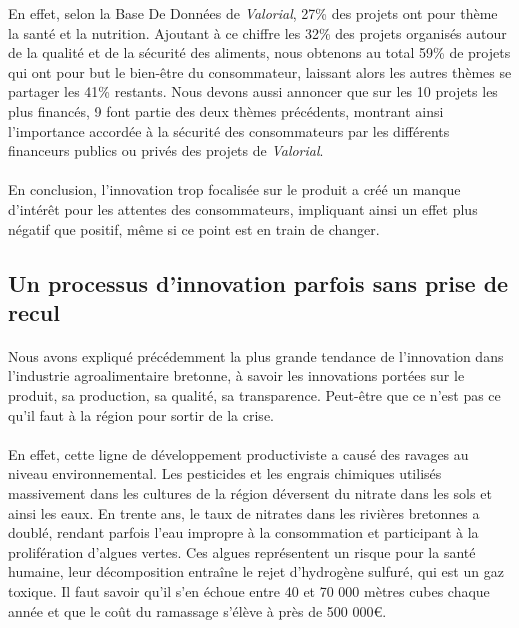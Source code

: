 \documentclass[a4paper,12pt]{report}
\begin{document}
			En effet, selon la Base De Données de \textit{Valorial}, 27\% des projets ont pour thème la santé et la nutrition. Ajoutant à ce chiffre les 32\% des projets  organisés autour de la qualité et de la sécurité des aliments, nous obtenons au total 59\% de projets qui ont pour but le bien-être du consommateur, laissant alors les autres thèmes se partager les 41\% restants. Nous devons aussi annoncer que sur les 10 projets les plus financés, 9 font partie des deux thèmes précédents, montrant ainsi l’importance accordée à la sécurité des consommateurs par les différents financeurs publics ou privés des projets de \textit{Valorial}.
			
			\paragraph{}En conclusion, l'innovation trop focalisée sur le produit a créé un manque d'intérêt pour les attentes des consommateurs, impliquant ainsi un effet plus négatif que positif, même si ce point est en train de changer.
						
		\subsection{Un processus d'innovation parfois sans prise de recul}
			
			\paragraph{}Nous avons expliqué précédemment la plus grande tendance de l’innovation dans l’industrie agroalimentaire bretonne, à savoir les innovations portées sur le produit, sa production, sa qualité, sa transparence. Peut-être que ce n’est pas ce qu’il faut à la région pour sortir de la crise.
			
			\paragraph{}En effet, cette ligne de développement productiviste a causé des ravages au niveau environnemental. Les pesticides et les engrais chimiques utilisés massivement dans les cultures de la région déversent du nitrate dans les sols et ainsi les eaux. En trente ans, le taux de nitrates dans les rivières bretonnes a doublé, rendant parfois l’eau impropre à la consommation et participant à la prolifération d’algues vertes\cite{NitratesAlguesVertesBretagne}. Ces algues représentent un risque pour la santé humaine, leur décomposition entraîne le rejet d’hydrogène sulfuré, qui est un gaz toxique. Il faut savoir qu’il s’en échoue entre 40 et 70 000 mètres cubes chaque année et que le coût du ramassage s’élève à près de 500 000€.
			
\end{document}
